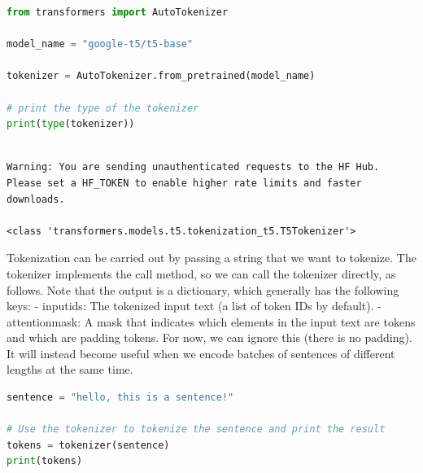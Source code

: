 \documentclass[../labs.tex]{subfiles}
\begin{document}
\begin{lstlisting}[language=Python,basicstyle=\ttfamily\scriptsize,breaklines=true,breakatwhitespace=false,columns=fullflexible,keepspaces=true,numbers=none]
from transformers import AutoTokenizer

model_name = "google-t5/t5-base"

tokenizer = AutoTokenizer.from_pretrained(model_name)

# print the type of the tokenizer
print(type(tokenizer))
\end{lstlisting}

\hypertarget{res:lab02-text-01-t5-ipynb-2-9be7cd588872}{}

\begin{lstlisting}[basicstyle=\ttfamily\scriptsize,breaklines=true,breakatwhitespace=false,columns=fullflexible,keepspaces=true]

Warning: You are sending unauthenticated requests to the HF Hub. Please set a HF_TOKEN to enable higher rate limits and faster downloads.

<class 'transformers.models.t5.tokenization_t5.T5Tokenizer'>

\end{lstlisting}



\noindent Tokenization can be carried out by passing a string that we want to tokenize. The tokenizer implements the call method, so we can call the tokenizer directly, as follows. Note that the output is a dictionary, which generally has the following keys: - inputids: The tokenized input text (a list of token IDs by default). - attentionmask: A mask that indicates which elements in the input text are tokens and which are padding tokens. For now, we can ignore this (there is no padding). It will instead become useful when we encode batches of sentences of different lengths at the same time.

\begin{lstlisting}[language=Python,basicstyle=\ttfamily\scriptsize,breaklines=true,breakatwhitespace=false,columns=fullflexible,keepspaces=true,numbers=none]
sentence = "hello, this is a sentence!"

# Use the tokenizer to tokenize the sentence and print the result
tokens = tokenizer(sentence)
print(tokens)
\end{lstlisting}

\hypertarget{res:lab02-text-01-t5-ipynb-5-2ef010faf1a3}{}
\end{document}
